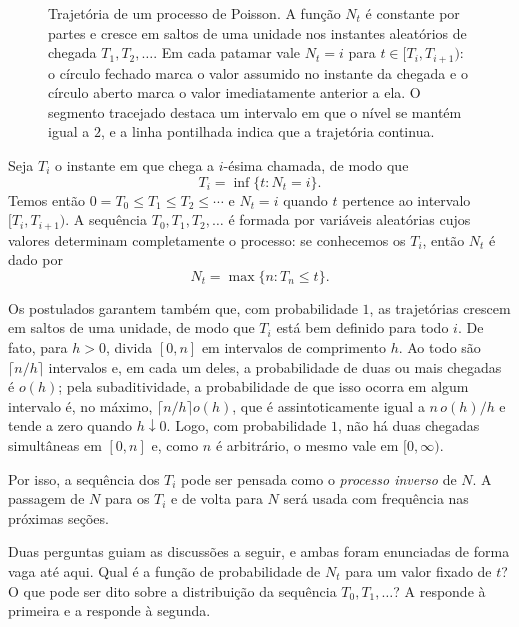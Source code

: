 \documentclass[12pt,portuguese]{article}
\theoremstyle{definition}
\theoremstyle{plainexercise}
\theoremstyle{starredexercise}
\theoremstyle{definition}
\begin{document}
\begin{figure}[H]
  \caption{Trajetória de um processo de Poisson. A função $N_t$ é constante
    por partes e cresce em saltos de uma unidade nos instantes aleatórios de
    chegada $T_1,T_2,\ldots$. Em cada patamar vale $N_t=i$ para
    $t\in[T_i,T_{i+1})$: o círculo fechado marca o valor assumido no instante
    da chegada e o círculo aberto marca o valor imediatamente anterior a ela.
    O segmento tracejado destaca um intervalo em que o nível se mantém igual a
    $2$, e a linha pontilhada indica que a trajetória continua.}
  \label{fig:trajetoria-poisson}
\end{figure}

Seja $T_i$ o instante em que chega a $i$-ésima chamada, de modo que
\begin{equation}\label{eq:tempo-chegada}
  T_i=\inf\{t:N_t=i\}.
\end{equation}
Temos então $0=T_0\leqslant T_1\leqslant T_2\leqslant\cdots$ e
$N_t=i$ quando $t$ pertence ao intervalo $[T_i,T_{i+1})$. A sequência
$T_0,T_1,T_2,\ldots$ é formada por variáveis aleatórias cujos valores
determinam completamente o processo: se conhecemos os $T_i$, então $N_t$ é dado
por
\[
  N_t=\max\{n:T_n\leqslant t\}.
\]

Os postulados garantem também que, com probabilidade $1$, as trajetórias
crescem em saltos de uma unidade, de modo que $T_i$ está bem definido para
todo $i$. De fato, para $h>0$, divida $[0,n]$ em intervalos de comprimento
$h$. Ao todo são $\lceil n/h\rceil$ intervalos e, em cada um deles, a
probabilidade de duas ou mais chegadas é $o(h)$; pela subaditividade, a
probabilidade de que isso ocorra em algum intervalo é, no máximo,
$\lceil n/h\rceil o(h)$, que é assintoticamente igual a $n\,o(h)/h$ e tende a
zero quando $h\downarrow0$.
Logo, com probabilidade $1$, não há duas chegadas simultâneas em $[0,n]$ e,
como $n$ é arbitrário, o mesmo vale em $[0,\infty)$.

Por isso, a sequência dos $T_i$ pode ser pensada como o \emph{processo inverso}
de $N$. A passagem de $N$ para os $T_i$ e de volta para $N$ será usada com
frequência nas próximas seções.

Duas perguntas guiam as discussões a seguir, e ambas foram enunciadas de forma
vaga até aqui. Qual é a função de probabilidade de $N_t$ para um valor fixado
de $t$? O que pode ser dito sobre a distribuição da sequência
$T_0,T_1,\ldots$? A  responde à primeira e a
 responde à segunda.
\end{document}
